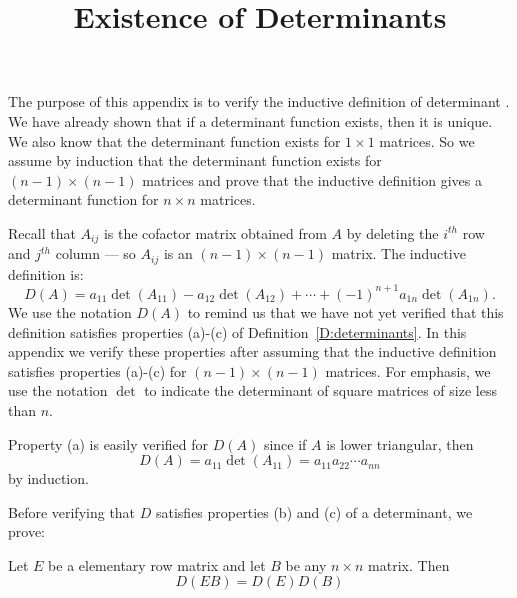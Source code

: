 \documentclass{ximera}
\title{Existence of Determinants}
\begin{document}
\begin{abstract}
\end{abstract}
\maketitle


\label{A:det}

The purpose of this appendix is to verify the inductive
definition of determinant . We have already
shown that if a determinant function exists, then it is unique.
We also know that the determinant function exists for $1\times
1$ matrices. So we assume by induction that the determinant function
exists for $(n-1)\times(n-1)$ matrices and prove that the
inductive definition gives a determinant function for $n\times
n$ matrices.  

Recall that $A_{ij}$ is the cofactor matrix obtained from $A$ by
deleting the $i^{th}$ row and $j^{th}$ column --- so $A_{ij}$ is
an $(n-1)\times(n-1)$ matrix.  The inductive definition is:
\[
D(A) = a_{11}\det(A_{11})-a_{12}\det(A_{12})+\cdots 
+(-1)^{n+1}a_{1n}\det(A_{1n}).
\] 
We use the notation $D(A)$ to remind us that we have not yet
verified that this definition satisfies properties (a)-(c) of
Definition~\ref{D:determinants}.  In this appendix we verify these
properties after assuming that the inductive definition
satisfies properties (a)-(c) for $(n-1)\times (n-1)$ matrices.
For emphasis, we use the notation $\det$ to indicate the
determinant of square matrices of size less than $n$.

Property (a) is easily verified for $D(A)$ since if $A$ is lower
triangular, then
\[
D(A) = a_{11}\det(A_{11}) = a_{11}a_{22}\cdots a_{nn}
\]
by induction.

Before verifying that $D$ satisfies properties (b) and (c) of a
determinant, we prove:
\begin{lemma}
Let $E$ be a elementary row matrix and let $B$ be any $n\times
n$ matrix.   Then
\begin{equation} \label{e:proddetE}
D(EB) = D(E) D(B)
\end{equation} 
\end{lemma}
\end{document}
